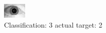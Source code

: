 \begin{figure}[h!]
\begin{center}
\includegraphics[width=0.60\columnwidth]{figures/ID1753_class_3_target_2.png}
\end{center}
\caption{ Classification: 3 actual target: 2}
\label{fig:ID1753_class_3_target_2}
\end{figure}
